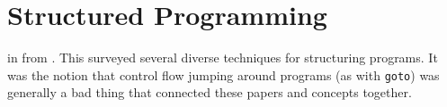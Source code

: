 \section{Structured Programming}

 in \citeyear{structured_programming_1972}
from \citeauthor{structured_programming_1972}.
This surveyed several diverse techniques for structuring programs.
It was the notion that control flow jumping around programs (as with \texttt{goto})
was generally a bad thing that connected these papers and concepts together.
